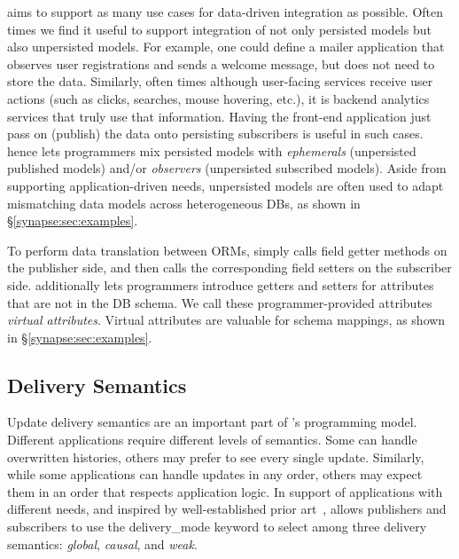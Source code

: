  \synapse aims to support as many use cases
for data-driven integration as possible.  Often times we find it useful to
support integration of not only persisted models but also unpersisted models.
For example, one could define a mailer application that observes user
registrations and sends a welcome message, but does not need to store the data.
Similarly, often times although user-facing services receive user actions
(such as clicks, searches, mouse hovering, etc.), it is backend analytics
services that truly use that information.  Having the front-end application just
pass on (publish) the data onto persisting subscribers is useful in such cases.
\synapse hence lets programmers mix persisted models with {\em ephemerals}
(unpersisted published models)
and/or {\em observers} (unpersisted subscribed models).  Aside from
supporting application-driven needs, unpersisted models are often used to
adapt mismatching data models across heterogeneous DBs, as shown in
\S\ref{synapse:sec:examples}.

 To perform data translation between ORMs,
\synapse simply calls field getter methods on the publisher side, and then
calls the corresponding field setters on the subscriber side. \synapse
additionally lets programmers introduce getters and setters for attributes
that are not in the DB schema.  We call these programmer-provided attributes
{\em virtual attributes}. Virtual attributes are valuable for schema mappings,
as shown in \S\ref{synapse:sec:examples}.

\endgroup

\subsection{\synapse Delivery Semantics}
\label{synapse:sec:semantics}
Update delivery semantics are an
important part of \synapse's programming model. Different applications
require different levels of semantics.  Some can handle overwritten histories,
others may prefer to see every single update.  Similarly, while some
applications can handle updates in any order, others may expect them in an
order that respects application logic. In support of applications with
different needs, and inspired by well-established prior
art~\cite{Lamport:1978:TCO:359545.359563}, \synapse allows
publishers and subscribers to use the {\code delivery\_mode} keyword
to select among three delivery semantics: {\em global},
{\em causal}, and {\em weak}.  

